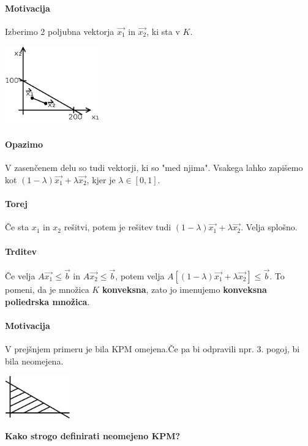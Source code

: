 \documentclass[a4paper,10pt]{article}
\begin{document}
\paragraph{Motivacija}
Izberimo 2 poljubna vektorja $\vec{x_1}$ in $\vec{x_2}$, ki sta v $K$.
	\begin{center}
	\includegraphics[width=4.05cm,height=3.35cm]{Slike/KPMMotivacija1.png}
	\end{center}

\paragraph{Opazimo}
V zasen\v cenem delu so tudi vektorji, ki so "med njima". Vsakega lahko zapi\v semo kot $(1 - \lambda)\vec{x_1} + \lambda \vec{x_2}$, kjer je $\lambda \in [0, 1]$.

\paragraph{Torej}
\v Ce sta $x_1$ in $x_2$ re\v sitvi, potem je re\v sitev tudi $(1 - \lambda)\vec{x_1} + \lambda \vec{x_2}$. Velja splo\v sno.

\paragraph{Trditev}
\v Ce velja $A \vec{x_1} \leq \vec b$ in $A \vec{x_2} \leq \vec b$, potem velja $A[(1 - \lambda)\vec{x_1} + \lambda \vec{x_2}] \leq \vec b$. To pomeni, da je mno\v zica $K$ \textbf{konveksna}, zato jo imenujemo \textbf{konveksna poliedrska mno\v zica}.

\paragraph{Motivacija}
V prej\v snjem primeru je bila KPM omejena.\v Ce pa bi odpravili npr. 3. pogoj, bi bila neomejena.\\
	\begin{center}
	\includegraphics[width=2.8cm,height=1.85cm]{Slike/KPMMotivacija2.png}
	\end{center}
\textbf{Kako strogo definirati neomejeno KPM?}\\
\end{document}
